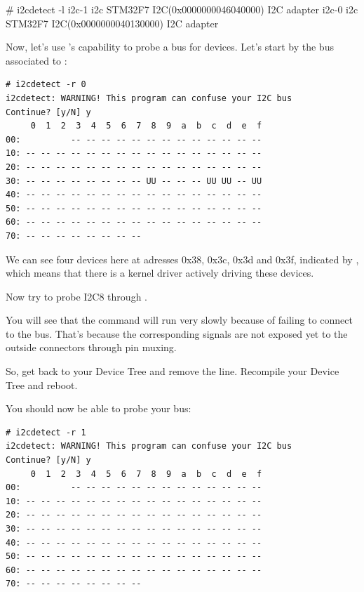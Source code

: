 {\begin{bashinput}
# i2cdetect -l
i2c-1   i2c             STM32F7 I2C(0x0000000046040000)         I2C adapter
i2c-0   i2c             STM32F7 I2C(0x0000000040130000)         I2C adapter

\end{bashinput}

Now, let's use 's capability to probe a bus for devices.
Let's start by the bus associated to :

\begin{verbatim}
# i2cdetect -r 0
i2cdetect: WARNING! This program can confuse your I2C bus
Continue? [y/N] y
     0  1  2  3  4  5  6  7  8  9  a  b  c  d  e  f
00:          -- -- -- -- -- -- -- -- -- -- -- -- -- 
10: -- -- -- -- -- -- -- -- -- -- -- -- -- -- -- -- 
20: -- -- -- -- -- -- -- -- -- -- -- -- -- -- -- -- 
30: -- -- -- -- -- -- -- -- UU -- -- -- UU UU -- UU 
40: -- -- -- -- -- -- -- -- -- -- -- -- -- -- -- -- 
50: -- -- -- -- -- -- -- -- -- -- -- -- -- -- -- -- 
60: -- -- -- -- -- -- -- -- -- -- -- -- -- -- -- -- 
70: -- -- -- -- -- -- -- --
\end{verbatim}

We can see four devices here at adresses 0x38, 0x3c, 0x3d and 0x3f,
indicated by , which means that there is a kernel driver actively
driving these devices.

Now try to probe I2C8 through .

You will see that the command will run very slowly because of failing to
connect to the bus. That's because the corresponding signals are
not exposed yet to the outside connectors through pin muxing.

So, get back to your Device Tree and remove the 
line. Recompile your Device Tree and reboot.

You should now be able to probe your bus:

\begin{verbatim}
# i2cdetect -r 1
i2cdetect: WARNING! This program can confuse your I2C bus
Continue? [y/N] y
     0  1  2  3  4  5  6  7  8  9  a  b  c  d  e  f
00:          -- -- -- -- -- -- -- -- -- -- -- -- --
10: -- -- -- -- -- -- -- -- -- -- -- -- -- -- -- --
20: -- -- -- -- -- -- -- -- -- -- -- -- -- -- -- --
30: -- -- -- -- -- -- -- -- -- -- -- -- -- -- -- --
40: -- -- -- -- -- -- -- -- -- -- -- -- -- -- -- --
50: -- -- -- -- -- -- -- -- -- -- -- -- -- -- -- --
60: -- -- -- -- -- -- -- -- -- -- -- -- -- -- -- --
70: -- -- -- -- -- -- -- --
\end{verbatim}

}

